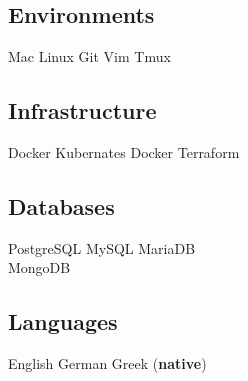 \documentclass[]{deedy-resume-openfont}
\begin{document}
\begin{minipage}[t]{0.33\textwidth}
\subsection{Environments}
Mac \textbullet{}
Linux \textbullet{}
Git \textbullet{}
Vim \textbullet{}
Tmux
\sectionsep

\subsection{Infrastructure}
Docker \textbullet{}
Kubernates \textbullet{}
Docker \textbullet{}
Terraform
\sectionsep

\subsection{Databases}
PostgreSQL \textbullet{}
MySQL \textbullet{}
MariaDB \\
MongoDB \\
\sectionsep

\subsection{Languages}
English \textbullet{}
German \textbullet{}
Greek (\textbf{native})

%
%

\end{minipage}
\hfill
\end{document}
